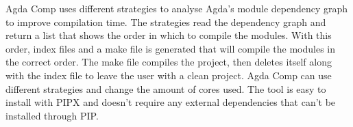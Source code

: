 Agda Comp uses different strategies to analyse Agda's module dependency graph
to improve compilation time. The strategies read the dependency graph and
return a list that shows the order in which to compile the modules. With this
order, index files and a make file is generated that will compile the modules
in the correct order. The make file compiles the project, then deletes itself
along with the index file to leave the user with a clean project. Agda Comp can
use different strategies and change the amount of cores used. The tool is easy
to install with PIPX and doesn't require any external dependencies that can't
be installed through PIP.




